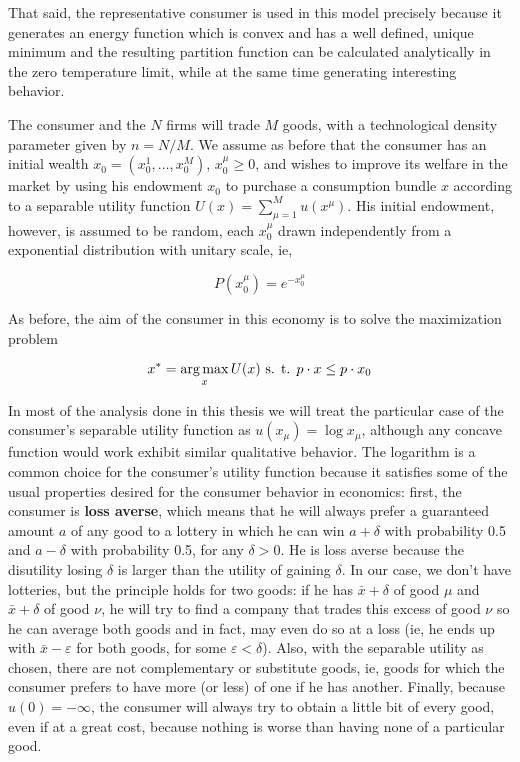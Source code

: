 That said, the representative consumer is used in this model precisely
because it generates an energy function which is convex and has a
well defined, unique minimum and the resulting partition function can
be calculated analytically in the zero temperature limit, while at the
same time generating interesting behavior.

The consumer and the $N$ firms will trade $M$ goods, with a
technological density parameter given by $n = N/M$. We assume as
before that the consumer has an initial wealth
$x_0 = (x_0^1, \ldots, x_0^M)$, $x_0^\mu \geq 0$, and wishes to
improve its welfare in the market by using his endowment $x_0$ to
purchase a consumption bundle $x$ according to a separable utility
function $U(x) = \sum_{\mu=1}^M u(x^\mu)$. His initial endowment,
however, is assumed to be random, each $x_0^\mu$ drawn independently
from a exponential distribution with unitary scale, ie,

\begin{equation}
  \label{eq:1}
  P(x_0^\mu) = e^{-x_0^\mu}
\end{equation}

As before, the aim of the consumer in this economy is to solve the
maximization problem

\begin{equation}
  \label{eq:3}
  x^\ast = \operatorname*{arg\,max}_{x} U(x) \text{ s. t. } p\cdot x \leq p\cdot x_0
\end{equation}

In most of the analysis done in this thesis we will treat the
particular case of the consumer's separable utility function as
$u(x_\mu) = \log x_\mu$, although any concave function would work
exhibit similar qualitative behavior. The logarithm is a common choice
for the consumer's utility function because it satisfies some of the
usual properties desired for the consumer behavior in economics:
first, the consumer is \textbf{loss averse}, which means that he will
always prefer a guaranteed amount $a$ of any good to a lottery in
which he can win $a + \delta$ with probability 0.5 and $a - \delta$
with probability 0.5, for any $\delta > 0$. He is loss averse because
the disutility losing $\delta$ is larger than the utility of gaining
$\delta$. In our case, we don't have lotteries, but the principle
holds for two goods: if he has $\bar{x} + \delta$ of good $\mu$ and
$\bar{x} + \delta$ of good $\nu$, he will try to find a company that
trades this excess of good $\nu$ so he can average both goods and in
fact, may even do so at a loss (ie, he ends up with
$\bar{x} - \varepsilon$ for both goods, for some
$\varepsilon < \delta$). Also, with the separable utility as chosen,
there are not complementary or substitute goods, ie, goods for which
the consumer prefers to have more (or less) of one if he has
another. Finally, because $u(0) = -\infty$, the consumer will always
try to obtain a little bit of every good, even if at a great cost,
because nothing is worse than having none of a particular good.

